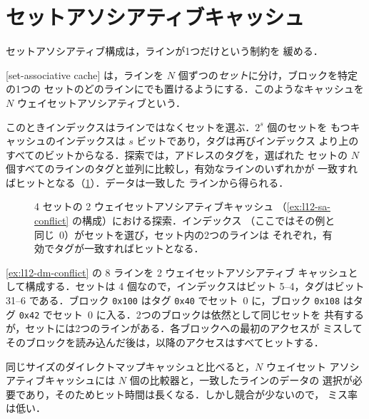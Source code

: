 \documentclass[../main.tex]{subfiles}
\begin{document}
\section{セットアソシアティブキャッシュ}
\label{sec:l12-sa}

セットアソシアティブ構成は，ラインが1つだけという制約を
緩める．

\begin{definition}[セットアソシアティブキャッシュ]
  [set-associative cache]%
  は，ラインを $N$ 個ずつの\emph{セット}に分け，ブロックを特定の1つの
  セットのどのラインにでも置けるようにする．このようなキャッシュを $N$
  ウェイセットアソシアティブという．
\end{definition}

このときインデックスはラインではなくセットを選ぶ．$2^{s}$ 個のセットを
もつキャッシュのインデックスは $s$ ビットであり，タグは再びインデックス
より上のすべてのビットからなる．探索では，アドレスのタグを，選ばれた
セットの $N$ 個すべてのラインのタグと並列に比較し，有効なラインのいずれかが
一致すればヒットとなる（\cref{fig:l12-set-associative}）．データは一致した
ラインから得られる．

\begin{figure}[htbp]
  \centering
  
  \caption{4 セットの 2 ウェイセットアソシアティブキャッシュ
    （\cref{ex:l12-sa-conflict} の構成）における探索．インデックス
    （ここではその例と同じ~0）がセットを選び，セット内の2つのラインは
    それぞれ，有効でタグが一致すればヒットとなる．}
  \label{fig:l12-set-associative}
\end{figure}

\begin{example}
  \label{ex:l12-sa-conflict}
  \cref{ex:l12-dm-conflict} の 8 ラインを 2 ウェイセットアソシアティブ
  キャッシュとして構成する．セットは 4 個なので，インデックスはビット
  5--4，タグはビット 31--6 である．ブロック \texttt{0x100} はタグ
  \texttt{0x40} でセット~0 に，ブロック \texttt{0x108} はタグ
  \texttt{0x42} でセット~0 に入る．2つのブロックは依然として同じセットを
  共有するが，セットには2つのラインがある．各ブロックへの最初のアクセスが
  ミスしてそのブロックを読み込んだ後は，以降のアクセスはすべてヒットする．
\end{example}

同じサイズのダイレクトマップキャッシュと比べると，$N$ ウェイセット
アソシアティブキャッシュには $N$ 個の比較器と，一致したラインのデータの
選択が必要であり，そのためヒット時間は長くなる．しかし競合が少ないので，
ミス率は低い．
\end{document}
